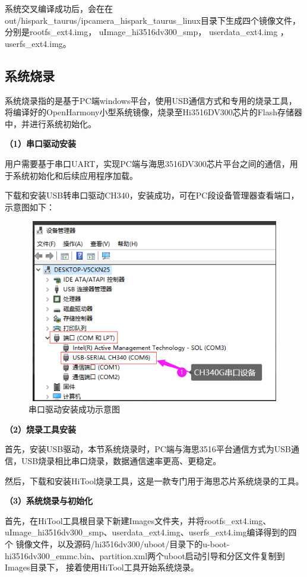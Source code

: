 系统交叉编译成功后，会在在out/hispark\_taurus/ipcamera\_hispark\_taurus\_linux目录下生成四个镜像文件，
分别是rootfs\_ext4.img， uImage\_hi3516dv300\_smp， userdata\_ext4.img ，userfs\_ext4.img。

\subsection{系统烧录}
系统烧录指的是基于PC端windows平台，使用USB通信方式和专用的烧录工具，将编译好的OpenHarmony小型系统镜像，烧录至Hi3516DV300芯片的Flash存储器中，并进行系统初始化。

\textbf{（1）串口驱动安装}

用户需要基于串口UART，实现PC端与海思3516DV300芯片平台之间的通信，用于系统初始化和后续应用程序加载。

下载和安装USB转串口驱动CH340，安装成功，可在PC段设备管理器查看端口，示意图如下：
\begin{figure}
    \includegraphics[width=12cm, height=8cm]{pic/usb-serial-340.png}
    \caption{串口驱动安装成功示意图}
    \label{usb-serial-ch340}
\end{figure}

\textbf{（2）烧录工具安装}

首先，安装USB驱动，本节系统烧录时，PC端与海思3516平台通信方式为USB通信，USB烧录相比串口烧录，数据通信速率更高、更稳定。

然后，下载和安装HiTool烧录工具，这是一款专门用于海思芯片系统烧录的工具。

\textbf{（3）系统烧录与初始化}

首先，在HiTool工具根目录下新建Images文件夹，并将rootfs\_ext4.img、uImage\_hi3516dv300\_smp、userdata\_ext4.img、userfs\_ext4.img编译得到的四个
镜像文件，以及源码/hi3516dv300/uboot/目录下的u-boot-hi3516dv300\_emmc.bin、partition.xml两个uboot启动引导和分区文件复制到Images目录下，
接着使用HiTool工具开始系统烧录。

